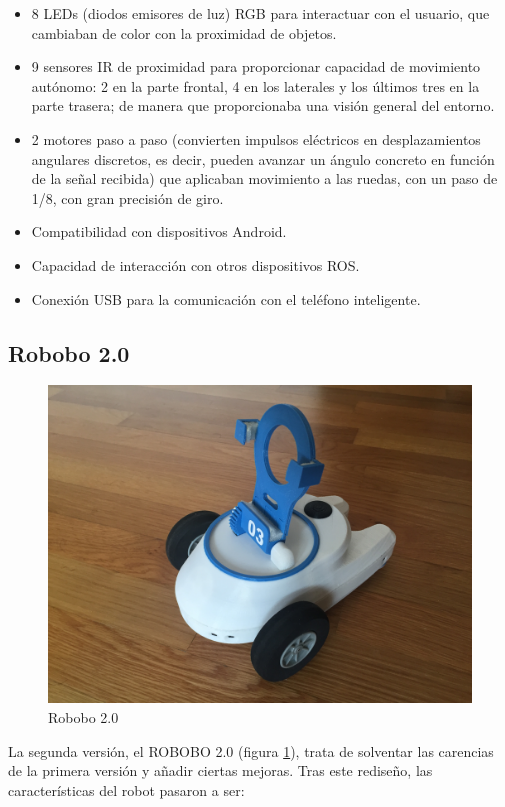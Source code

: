 \begin{itemize}

	\item 8 LEDs (diodos emisores de luz) RGB para interactuar con el usuario, que cambiaban de color con la proximidad de objetos.
	\item 9 sensores IR de proximidad para proporcionar capacidad de movimiento autónomo: 2 en la parte frontal, 4 en los laterales y los últimos tres en la parte trasera; de manera que proporcionaba una visión general del entorno.
	\item 2 motores paso a paso (convierten impulsos eléctricos en desplazamientos angulares discretos, es decir, pueden avanzar un ángulo concreto en función de la señal recibida) que aplicaban movimiento a las ruedas, con un paso de 1/8, con gran precisión de giro.
	\item Compatibilidad con dispositivos Android.
	\item Capacidad de interacción con otros dispositivos ROS.
	\item Conexión USB para la comunicación con el teléfono inteligente.

\end{itemize}

\subsection{Robobo 2.0}
\begin{figure}
	\centering
	\includegraphics[width=0.8\linewidth]{imagenes/robobo_rob.JPG}
	\caption{Robobo 2.0}
	\label{fig:robobo_2_0}
\end{figure} 

La segunda versión, el ROBOBO 2.0 (figura \ref{fig:robobo_2_0}), trata de solventar las carencias de la primera versión y añadir ciertas mejoras. Tras este rediseño, las características del robot pasaron a ser:

